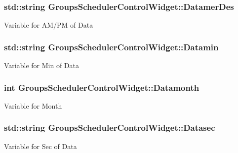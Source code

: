 \subsubsection[{\texorpdfstring{Datamer\+Des}{DatamerDes}}]{\setlength{\rightskip}{0pt plus 5cm}std\+::string Groups\+Scheduler\+Control\+Widget\+::\+Datamer\+Des\hspace{0.3cm}{\ttfamily [private]}}\hypertarget{classGroupsSchedulerControlWidget_a4b11331ab0f81e4f3a9bcb950950ee8e}{}\label{classGroupsSchedulerControlWidget_a4b11331ab0f81e4f3a9bcb950950ee8e}
Variable for A\+M/\+PM of Data 
\subsubsection[{\texorpdfstring{Datamin}{Datamin}}]{\setlength{\rightskip}{0pt plus 5cm}std\+::string Groups\+Scheduler\+Control\+Widget\+::\+Datamin\hspace{0.3cm}{\ttfamily [private]}}\hypertarget{classGroupsSchedulerControlWidget_a89db2576a184aa1b35a99905eed3cfe3}{}\label{classGroupsSchedulerControlWidget_a89db2576a184aa1b35a99905eed3cfe3}
Variable for Min of Data 
\subsubsection[{\texorpdfstring{Datamonth}{Datamonth}}]{\setlength{\rightskip}{0pt plus 5cm}int Groups\+Scheduler\+Control\+Widget\+::\+Datamonth\hspace{0.3cm}{\ttfamily [private]}}\hypertarget{classGroupsSchedulerControlWidget_a8122a727dcb1fecf4024e24c005cf557}{}\label{classGroupsSchedulerControlWidget_a8122a727dcb1fecf4024e24c005cf557}
Variable for Month 
\subsubsection[{\texorpdfstring{Datasec}{Datasec}}]{\setlength{\rightskip}{0pt plus 5cm}std\+::string Groups\+Scheduler\+Control\+Widget\+::\+Datasec\hspace{0.3cm}{\ttfamily [private]}}\hypertarget{classGroupsSchedulerControlWidget_ae4cf032cf6447ca4a8a04eae4822c939}{}\label{classGroupsSchedulerControlWidget_ae4cf032cf6447ca4a8a04eae4822c939}
Variable for Sec of Data 
